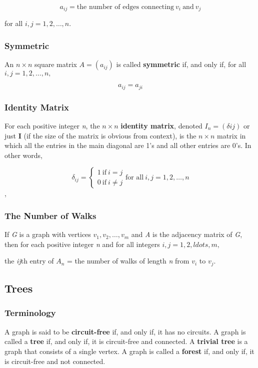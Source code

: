 \documentclass{article}
\begin{document}
\begin{equation}
a_{ij} = \text{the number of edges connecting} \ v_i \ \text{and} \ v_j
\end{equation}

for all $i, j = 1, 2, \ldots, n$.

\subsubsection{Symmetric}
An $n \times n$ square matrix $A = ( a_{ij} )$ is called \textbf{symmetric} if, and only if, for all $i, j =
1, 2, \ldots, n,$

\begin{equation}
a_{ij} = a_{ji}
\end{equation}

\subsubsection{Identity Matrix}
For each positive integer \textit{n}, the $n \times n$ \textbf{identity matrix}, denoted \textbf{$I_n = (\delta {ij})$} or just \textbf{I} (if the size of the matrix is obvious from context), is the $n \times n$ matrix in which all the entries in the main diagonal are 1’s and all other entries are 0’s. In other words,

\[
\delta _{ij} =
\begin{cases}
1 \ \text{if} \ i = j \\
0 \ \text{if} \ i \neq j
\end{cases}
\text{for all} \ i, j = 1, 2, \ldots, n
\],

\subsubsection{The Number of Walks}
If \textit{G} is a graph with vertices $v_1,v_2, \ldots, v_m$ and \textit{A} is the adjacency matrix of \textit{G}, then for each positive integer \textit{n} and for all integers $i, j = 1, 2, ldots , m,$

\begin{center}
the \textit{ij}th entry of $A_n$ = the number of walks of length \textit{n} from $v_i$ to $v_j$.
\end{center}

\setcounter{subsection}{4}
\subsection{Trees}
\subsubsection{Terminology}
A graph is said to be \textbf{circuit-free} if, and only if, it has no circuits. A graph is called a \textbf{tree} if, and only if, it is circuit-free and connected. A \textbf{trivial tree} is a graph that consists of a single vertex. A graph is called a \textbf{forest} if, and only if, it is circuit-free and not connected.
\end{document}
